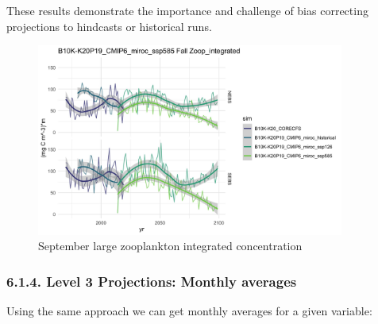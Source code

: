 \documentclass[
]{article}
\begin{document}
These results demonstrate the importance and challenge of bias
correcting projections to hindcasts or historical runs.

\begin{figure}
\centering
\includegraphics[width=0.9\textwidth,height=\textheight]{Figs/Fall_large_Zoop_bySSP.jpg}
\caption{September large zooplankton integrated concentration}
\end{figure}

\hypertarget{level-3-projections-monthly-averages}{%
\subsubsection{6.1.4. Level 3 Projections: Monthly
averages}\label{level-3-projections-monthly-averages}}

Using the same approach we can get monthly averages for a given
variable:
\end{document}
